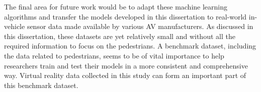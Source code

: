 The final area for future work would be to adapt these machine learning algorithms and transfer the models developed in this dissertation to real-world in-vehicle sensor data made available by various AV manufacturers. As discussed in this dissertation, these datasets are yet relatively small and without all the required information to focus on the pedestrians. A benchmark dataset, including the data related to pedestrians, seems to be of vital importance to help researchers train and test their models in a more consistent and comprehensive way. Virtual reality data collected in this study can form an important part of this benchmark dataset. 


